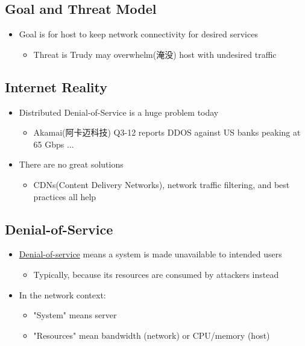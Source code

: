 \documentclass[12pt]{ctexart}   %
\begin{document}
	\subsection{Goal and Threat Model}
	\begin{itemize}
		\item Goal is for host to keep network connectivity for desired services
		\begin{itemize}
			\item Threat is Trudy may overwhelm(淹没) host with undesired traffic
		\end{itemize}
	\end{itemize}

	\subsection{Internet Reality}
	\begin{itemize}
		\item Distributed Denial-of-Service is a huge problem today
		\begin{itemize}
			\item Akamai(阿卡迈科技) Q3-12 reports DDOS against US banks peaking at 65 Gbps ... 
		\end{itemize}

		\item There are no great solutions
		\begin{itemize}
			\item CDNs(Content Delivery Networks), network traffic filtering, and best practices all help
		\end{itemize}
	\end{itemize}

	\subsection{Denial-of-Service}
	\begin{itemize}
		\item \underline{Denial-of-service} means a system is made unavailable to intended users
		\begin{itemize}
			\item Typically, because its resources are consumed by attackers instead
		\end{itemize}

		\item In the network context:
		\begin{itemize}
			\item "System" means server
			\item "Resources" mean bandwidth (network) or CPU/memory (host)
		\end{itemize}
	\end{itemize}
\end{document}
